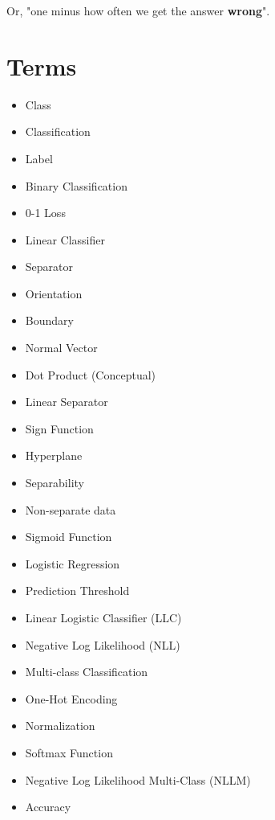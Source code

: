     Or, "one minus how often we get the answer \textbf{wrong}".
\pagebreak

\section{Terms}

    \begin{itemize}
        \item Class
        \item Classification
        \item Label
        \item Binary Classification
        \item 0-1 Loss
        \item Linear Classifier
        \item Separator
        \item Orientation
        \item Boundary
        \item Normal Vector
        \item Dot Product (Conceptual)
        \item Linear Separator
        \item Sign Function
        \item Hyperplane
        \item Separability
        \item Non-separate data
        \item Sigmoid Function
        \item Logistic Regression
        \item Prediction Threshold
        \item Linear Logistic Classifier (LLC)
        \item Negative Log Likelihood (NLL)
        \item Multi-class Classification
        \item One-Hot Encoding
        \item Normalization
        \item Softmax Function
        \item Negative Log Likelihood Multi-Class (NLLM)
        \item Accuracy
    \end{itemize}





